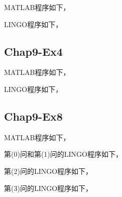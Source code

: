 \documentclass[12pt,a4paper]{article}
\begin{document}
MATLAB程序如下，


LINGO程序如下，


\subsection{Chap9-Ex4}\label{sec:ex4_code}

MATLAB程序如下，


LINGO程序如下，


\subsection{Chap9-Ex8}\label{sec:ex8_code}

MATLAB程序如下，


第(0)问和第(1)问的LINGO程序如下，


第(2)问的LINGO程序如下，


第(3)问的LINGO程序如下，

\end{document}
